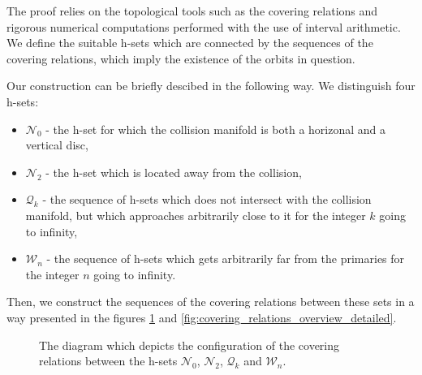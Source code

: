 \documentclass[1p]{article}
\begin{document}
The proof relies on the topological tools such as the covering relations and rigorous numerical computations performed with the use of interval arithmetic. We define the suitable h-sets which are connected by the sequences of the covering relations, which imply the existence of the orbits in question.

Our construction can be briefly descibed in the following way. We distinguish four h-sets:
\begin{itemize}
    \item $\mathcal{N}_0$ - the h-set for which the collision manifold is both a horizonal and a vertical disc,
    \item $\mathcal{N}_2$ - the h-set which is located away from the collision,
    \item $\mathcal{Q}_k$ - the sequence of h-sets which does not intersect with the collision manifold, but which approaches arbitrarily close to it for the integer $k$ going to infinity,
    \item $\mathcal{W}_n$ - the sequence of h-sets which gets arbitrarily far from the primaries for the integer $n$ going to infinity.
\end{itemize}
Then, we construct the sequences of the covering relations between these sets in a way presented in the figures \ref{fig:covering_relations_overview} and \ref{fig:covering_relations_overview_detailed}.
\begin{figure}[ht]
    \centering
    \vspace{8pt}
    \caption{The diagram which depicts the configuration of the covering relations between the h-sets $\mathcal{N}_0$, $\mathcal{N}_2$, $\mathcal{Q}_k$ and $\mathcal{W}_n$.}
    \label{fig:covering_relations_overview}
\end{figure}
\end{document}
